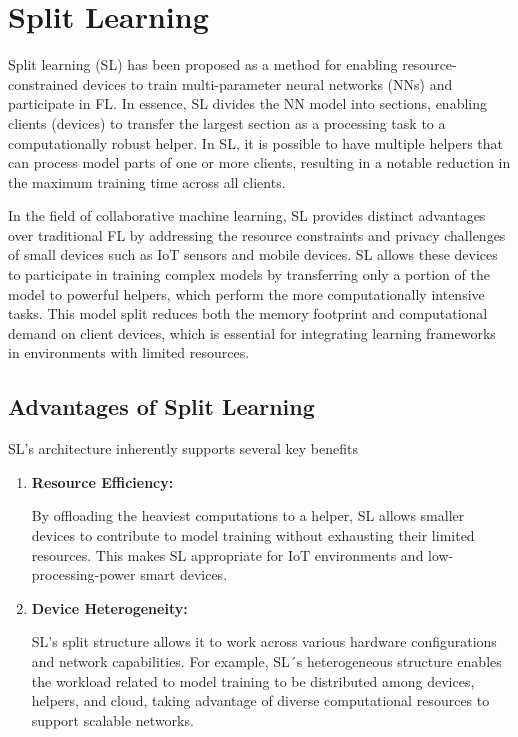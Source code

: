\begin{enumerate}
\end{enumerate}


\section{Split Learning}
\label{sec:split_learning}

Split learning (SL) has been proposed as a method for enabling resource-constrained devices to train multi-parameter neural networks (NNs) and participate in \gls{FL}. In essence, \gls{SL} divides the \gls{NN} model into sections, enabling clients (devices) to transfer the largest section as a processing task to a computationally robust helper. In SL, it is possible to have multiple helpers that can process model parts of one or more clients, resulting in a notable reduction in the maximum training time across all clients.

In the field of collaborative machine learning, \gls{SL} provides distinct advantages over traditional \gls{FL} by addressing the resource constraints and privacy challenges of small devices such as IoT sensors and mobile devices. SL allows these devices to participate in training complex models by transferring only a portion of the model to powerful helpers, which perform the more computationally intensive tasks. This model split reduces both the memory footprint and computational demand on client devices, which is essential for integrating learning frameworks in environments with limited resources.

\subsection{Advantages of Split Learning}
\label{sec:advantages_of_sl}

SL’s architecture inherently supports several key benefits

\begin{enumerate}
	\item \textbf{Resource Efficiency:} 
	
	By offloading the heaviest computations to a helper, \gls{SL} allows smaller devices to contribute to model training without exhausting their limited resources. This makes SL appropriate for IoT environments and low-processing-power smart devices.
	
	\item \textbf{Device Heterogeneity:} 
	
	SL’s split structure allows it to work across various hardware configurations and network capabilities. For example, SL´s heterogeneous structure enables the workload related to model training to be distributed among devices, helpers, and cloud, taking advantage of diverse computational resources to support scalable networks.
\end{enumerate}

